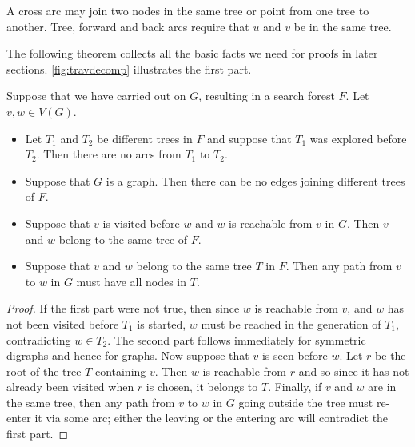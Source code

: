 A cross arc may 
join two nodes in the same tree or point from one tree to another. Tree, forward and back arcs require that $u$ and $v$ be in the same tree.




The following theorem collects all the basic facts we need for proofs
in later sections. \cref{fig:travdecomp} illustrates the first part.

\begin{Theorem}
\label{thm:trav}
Suppose that we have carried out  on $G$, 
resulting in a search forest $F$. Let $v, w \in V(G)$.
\begin{itemize}
\item Let $T_1$ and $T_2$ be different trees in $F$ and suppose that $T_1$ was 
explored before $T_2$. Then there are no arcs from $T_1$ to $T_2$. 

\item Suppose that $G$ is a graph. Then there can be no edges joining different 
trees of $F$.

\item Suppose that $v$ is visited before $w$ and $w$ is reachable from $v$ in 
$G$. Then $v$ and $w$ belong to the same tree of $F$.

\item Suppose that $v$ and $w$ belong to the same tree $T$ in $F$. Then any path
 from $v$ to $w$ in $G$ must have all nodes in $T$.
\end{itemize}
\end{Theorem}

\begin{proof}
If the first part were not true, then since $w$ is reachable from $v$,
and $w$ has not been visited before $T_1$ is started, $w$ must be reached
in the generation of $T_1$, contradicting $w\in T_2$. The second part
follows immediately for symmetric digraphs and hence for graphs. Now
suppose that $v$ is seen before $w$. Let $r$ be the root of the tree $T$
containing $v$. Then $w$ is reachable from $r$ and so since it has not
already been visited when $r$ is chosen, it belongs to $T$. Finally, if
$v$ and $w$ are in the same tree, then any path from $v$ to $w$ in $G$
going outside the tree must re-enter it via some arc; either the leaving
or the entering arc will contradict the first part.
\end{proof}


